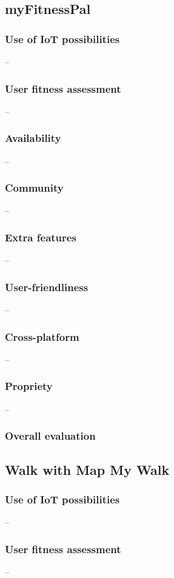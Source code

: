\subsection{myFitnessPal}

\subsubsection*{Use of IoT possibilities} --
\subsubsection*{User fitness assessment} --
\subsubsection*{Availability} --
\subsubsection*{Community} -- 
\subsubsection*{Extra features} -- 
\subsubsection*{User-friendliness} -- 
\subsubsection*{Cross-platform} -- 
\subsubsection*{Propriety} -- 
\subsubsection*{Overall evaluation}

\subsection{Walk with Map My Walk}

\subsubsection*{Use of IoT possibilities} --
\subsubsection*{User fitness assessment} --
